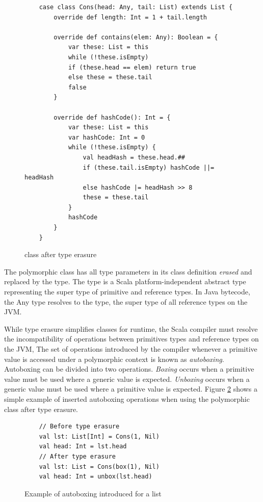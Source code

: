 \begin{figure}[!htb]
	\begin{verbatim}
	case class Cons(head: Any, tail: List) extends List {
		override def length: Int = 1 + tail.length
			
		override def contains(elem: Any): Boolean = {
			var these: List = this
			while (!these.isEmpty) 
			if (these.head == elem) return true
			else these = these.tail
			false
		}
			
		override def hashCode(): Int = {
			var these: List = this
			var hashCode: Int = 0
			while (!these.isEmpty) {
				val headHash = these.head.##
				if (these.tail.isEmpty) hashCode ||= headHash
				else hashCode |= headHash >> 8
				these = these.tail	
			}
			hashCode
		}
	}		
	\end{verbatim}
	\caption{ class after type erasure}
	\label{example:erase-cons}
\end{figure}

The polymorphic  class has all type parameters in its class definition \textit{erased} and replaced by the  type.
The  type is a Scala platform-independent\cite{scala:overview} abstract type representing the super type of primitive and reference types.
In Java bytecode, the {Any} type resolves to the  type, the super type of all reference types on the JVM.

While type erasure simplifies classes for runtime, the Scala compiler must resolve the incompatibility of operations between primitives types and reference types on the JVM\cite{java:vm-spec},
The set of operations introduced by the compiler whenever a primitive value is accessed under a polymorphic context is known as \textit{autoboxing}\cite{java:autoboxing}. 
Autoboxing can be divided into two operations.
\textit{Boxing} occurs when a primitive value must be used where a generic value is expected.
\textit{Unboxing} occurs when a generic value must be used where a primitive value is expected.
Figure \ref{example:autoboxing} shows a simple example of inserted autoboxing operations when using the polymorphic  class after type erasure.

\begin{figure}[!htb]
	\begin{verbatim}
	// Before type erasure 	
	val lst: List[Int] = Cons(1, Nil)
	val head: Int = lst.head
	// After type erasure
	val lst: List = Cons(box(1), Nil)
	val head: Int = unbox(lst.head) 
	\end{verbatim}
	\caption{Example of autoboxing introduced for a list}
	\label{example:autoboxing}
\end{figure}

